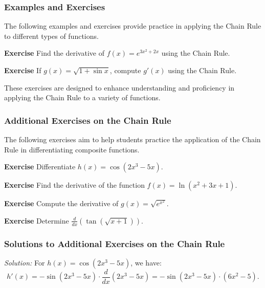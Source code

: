 \documentclass[a4paper,12pt]{book}
\newenvironment{exercise}[1][]
  {\par\medskip\noindent\textbf{Exercise #1} \rmfamily}
  {\medskip}
\newenvironment{solution}[1][]
{\par\noindent\textit{Solution:} \rmfamily}{\medskip}
\newcounter{example}
\begin{document}
\subsubsection*{Examples and Exercises}
The following examples and exercises provide practice in applying the Chain Rule to different types of functions.

\begin{exercise}
Find the derivative of \( f(x) = e^{3x^2 + 2x} \) using the Chain Rule.
\end{exercise}

\begin{exercise}
If \( g(x) = \sqrt{1 + \sin x} \), compute \( g'(x) \) using the Chain Rule.
\end{exercise}

These exercises are designed to enhance understanding and proficiency in applying the Chain Rule to a variety of functions.

\subsubsection*{Additional Exercises on the Chain Rule}

The following exercises aim to help students practice the application of the Chain Rule in differentiating composite functions.

\begin{exercise}
Differentiate \( h(x) = \cos(2x^3 - 5x) \).
\end{exercise}

\begin{exercise}
Find the derivative of the function \( f(x) = \ln(x^2 + 3x + 1) \).
\end{exercise}

\begin{exercise}
Compute the derivative of \( g(x) = \sqrt{e^{x^2}} \).
\end{exercise}

\begin{exercise}
Determine \( \frac{d}{dx} \left( \tan(\sqrt{x + 1}) \right) \).
\end{exercise}

\subsubsection*{Solutions to Additional Exercises on the Chain Rule}

\begin{solution}[to Exercise 1]
For \( h(x) = \cos(2x^3 - 5x) \), we have:
\[ h'(x) = -\sin(2x^3 - 5x) \cdot \frac{d}{dx}(2x^3 - 5x) = -\sin(2x^3 - 5x) \cdot (6x^2 - 5). \]
\end{solution}
\end{document}
